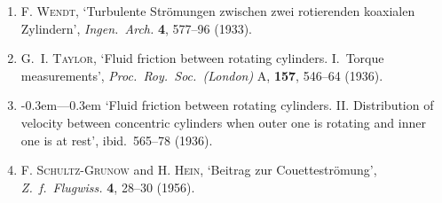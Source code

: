 \begin{enumerate}
\item F. \textsc{Wendt}, `Turbulente Str\"omungen zwischen zwei rotierenden koaxialen
Zylindern', \textit{Ingen.\ Arch.} \textbf{4}, 577--96 (1933).

\item G.~I. \textsc{Taylor}, `Fluid friction between rotating cylinders.  I.~Torque
measurements', \textit{Proc.\ Roy.\ Soc.\ (London)} A, \textbf{157}, 546--64 (1936).

\item \leavevmode\kern-0.3em---\kern0.3em `Fluid friction between rotating cylinders. II. Distribution of
velocity between concentric cylinders when outer one is rotating and inner
one is at rest', ibid.\ 565--78 (1936).

\item F. \textsc{Schultz-Grunow} and H. \textsc{Hein}, `Beitrag zur Couettestr\"omung', \textit{Z.\ f.\
Flugwiss.} \textbf{4}, 28--30 (1956).

\end{enumerate}
